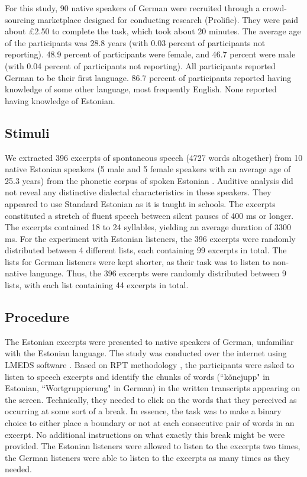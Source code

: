 \documentclass[output=paper]{langscibook}
\begin{document}
    For this study, 90 native speakers of German were recruited through a crowd-sourcing marketplace designed for conducting research (Prolific). They were paid about £2.50 to complete the task, which took about 20 minutes. The average age of the participants was 28.8 years (with 0.03 percent of participants not reporting). 48.9 percent of participants were female, and 46.7 percent were male (with 0.04 percent of participants not reporting). All participants reported German to be their first language. 86.7 percent of participants reported having knowledge of some other language, most frequently English. None reported having knowledge of Estonian.

    \subsection{Stimuli}
    We extracted 396 excerpts of spontaneous speech (4727 words altogether) from 10 native Estonian speakers (5 male and 5 female speakers with an average age of 25.3 years) from the phonetic corpus of spoken Estonian \citep[][]{lippusEtAl2015}. Auditive analysis did not reveal any distinctive dialectal characteristics in these speakers. They appeared to use Standard Estonian as it is taught in schools. %
    The excerpts constituted a stretch of fluent speech between silent pauses of 400 ms or longer. The excerpts contained 18 to 24 syllables, yielding an average duration of 3300 ms. For the experiment with Estonian listeners, the 396 excerpts were randomly distributed between 4 different lists, each containing 99 excerpts in total. 
    The lists for German listeners were kept shorter, as their task was to listen to non-native language. Thus, the 396 excerpts were randomly distributed between 9 lists, with each list containing 44 excerpts in total. 
    
    \subsection{Procedure} 
    The Estonian excerpts were presented to native speakers of German, unfamiliar with the Estonian language. The study was conducted over the internet using LMEDS software \citep[][]{lmeds}. Based on RPT methodology \citep[see, e.g.,][]{coleEtAl2010, coleEtAl2011, riesbergEtAl2020}, the participants were asked to listen to speech excerpts and identify the chunks of words (``kõnejupp" in Estonian, ``Wortgruppierung" in German) in the written transcripts appearing on the screen. Technically, they needed to click on the words that they perceived as occurring at some sort of a break. In essence, the task was to make a binary choice to either place a boundary or not at each consecutive pair of words in an excerpt. No additional instructions on what exactly this break might be were provided. The Estonian listeners were allowed to listen to the excerpts two times, the German listeners were able to listen to the excerpts as many times as they needed.
\end{document}
